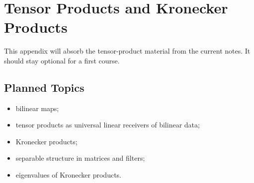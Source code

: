\chapter{Tensor Products and Kronecker Products}
\label{app:tensors}

\begin{draftbox}
This appendix will absorb the tensor-product material from the current notes.
It should stay optional for a first course.
\end{draftbox}

\section{Planned Topics}

\begin{itemize}
  \item bilinear maps;
  \item tensor products as universal linear receivers of bilinear data;
  \item Kronecker products;
  \item separable structure in matrices and filters;
  \item eigenvalues of Kronecker products.
\end{itemize}
